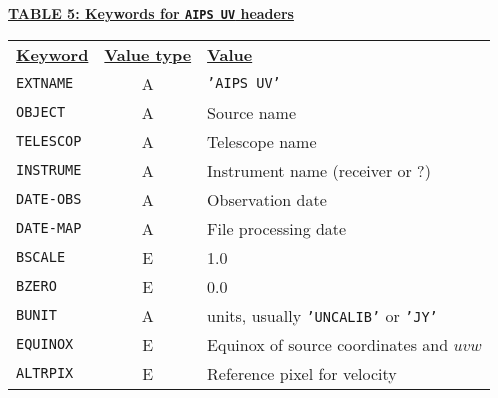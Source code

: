 \documentclass[twoside]{article}
\begin{document}
\begin{center}
\underline{\bf{TABLE 5: Keywords for {\tt AIPS UV} headers}}\\
\begin{tabular}{lcl}
\noalign{\vspace{2pt}} \label{ta:UVkeys}
\underline{{\bf Keyword}} & \underline{\bf{Value type}} &
    \underline{\bf{Value\vphantom{y}}} \\
\noalign{\vspace{2pt}}
{\tt EXTNAME}   & A & {\tt 'AIPS UV'}  \\
\hline
{\tt OBJECT}    & A & Source name \\
{\tt TELESCOP}  & A & Telescope name \\
{\tt INSTRUME}  & A & Instrument name (receiver or ?) \\
{\tt DATE-OBS}  & A & Observation date \\
{\tt DATE-MAP}  & A & File processing date \\
{\tt BSCALE}    & E & 1.0 \\
{\tt BZERO}     & E & 0.0 \\
{\tt BUNIT}     & A & units, usually {\tt 'UNCALIB'} or {\tt 'JY'} \\
{\tt EQUINOX}   & E & Equinox of source coordinates and $uvw$ \\
{\tt ALTRPIX}   & E & Reference pixel for velocity
\end{tabular}
\end{center}
\end{document}

